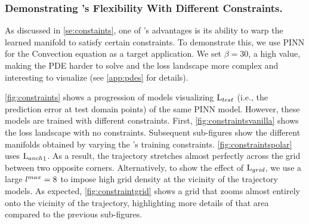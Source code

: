\documentclass[letterpaper]{article} %
\begin{document}
        \subsubsection{Demonstrating \proposedautencoder{}'s Flexibility With Different Constraints.} \label{ss:constraints}
        As discussed in \cref{se:constaints}, one of \proposedautencoder{}'s advantages is its ability to warp the learned manifold to satisfy certain constraints. To demonstrate this, we use PINN for the Convection equation as a target application. We set $\beta=30$, a high value, making the PDE harder to solve 
        and the loss landscape more complex and interesting to visualize (see \cref{app:pdes} for details).

        \cref{fig:constraints} shows a progression of \proposedautencoder{} models visualizing $\text{L}_{test}$  (i.e., the prediction error at test domain points) of the same PINN model. However, these \proposedautencoder{} models are trained with different constraints. First, \cref{fig:constraintsvanilla} shows the loss landscape with no constraints. Subsequent sub-figures show the different manifolds obtained by varying the \proposedautencoder{}'s training constraints.
        \cref{fig:constraintspolar} uses ${\text{L}_{anch}}_1$. As a result, the trajectory stretches almost perfectly across the grid between two opposite corners. 
        Alternatively, to show the effect of $\text{L}_{grid}$, 
        we use a large $l^{max}=8$ to impose high grid density at the vicinity of the trajectory models. As expected, \cref{fig:constraintgrid} shows a grid that zooms almost entirely onto
        the vicinity of the trajectory, highlighting more details of that area compared to the previous sub-figures.
\end{document}
